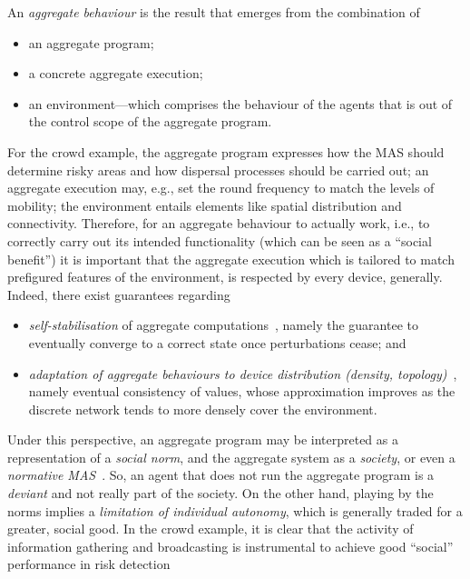 An \emph{aggregate behaviour} is the result
 that emerges from the combination of
\begin{itemize}
\item an aggregate program;
\item a concrete aggregate execution;
\item an environment---which comprises the behaviour of the agents
 that is out of the control scope of the aggregate program.
\end{itemize}
%
For the crowd example,
 the aggregate program expresses how the MAS 
 should determine risky areas and how dispersal processes should be carried out; an aggregate execution may, e.g., set the round frequency to match the levels of mobility; the environment entails elements like spatial distribution and connectivity.
%
Therefore, for an aggregate behaviour to actually work, i.e.,
 to correctly carry out its intended functionality
 (which can be seen as a ``social benefit'')
 it is important that the aggregate execution
 which is tailored to match prefigured features of the environment,
 is respected by every device, generally.
%
Indeed, there exist guarantees 
 regarding 
\begin{itemize}
\item \emph{self-stabilisation} of aggregate computations~\cite{DBLP:journals/tomacs/ViroliABDP18}, namely 
 the guarantee to eventually converge to a correct state
 once perturbations cease; and 
\item \emph{adaptation of aggregate behaviours to device distribution (density, topology)}~\cite{DBLP:journals/taas/BealVPD17},
 namely eventual consistency of values, 
 whose approximation improves as the discrete network
 tends to more densely cover the environment.
\end{itemize}
%
Under this perspective,
 an aggregate program may be interpreted
 as a representation of a \emph{social norm},
 and the aggregate system as a \emph{society}, or even a \emph{normative MAS}~\cite{DBLP:journals/jasss/HollanderW11}.
%
So, an agent that does not run the aggregate program
 is a \emph{deviant} and not really part of the society.
%
On the other hand, playing by the norms
 implies a \emph{limitation of individual autonomy},
 which is generally traded for a greater, social good.
%
In the crowd example, 
 it is clear that the activity of information gathering and broadcasting
 is instrumental to achieve good ``social'' performance in risk detection

